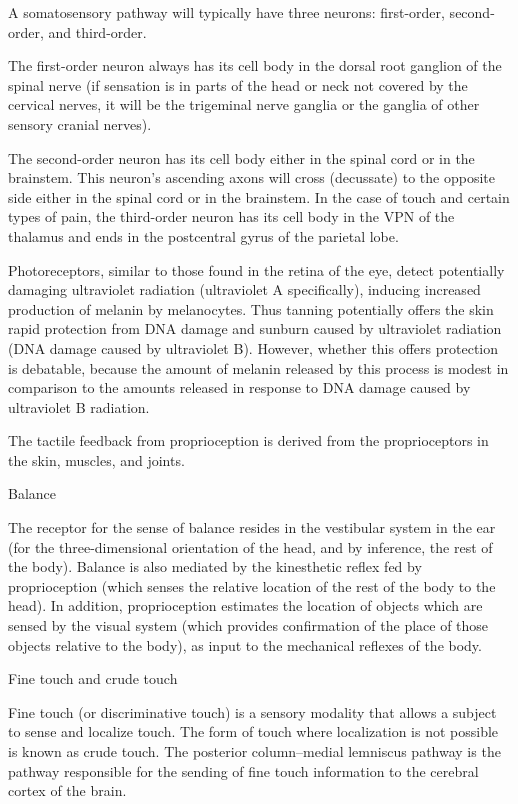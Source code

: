 A somatosensory pathway will typically have three neurons: first-order, second-order, and third-order.

The first-order neuron always has its cell body in the dorsal root ganglion of the spinal nerve (if sensation is in parts of the head or neck not covered by the cervical nerves, it will be the trigeminal nerve ganglia or the ganglia of other sensory cranial nerves).

The second-order neuron has its cell body either in the spinal cord or in the brainstem. This neuron's ascending axons will cross (decussate) to the opposite side either in the spinal cord or in the brainstem.
In the case of touch and certain types of pain, the third-order neuron has its cell body in the VPN of the thalamus and ends in the postcentral gyrus of the parietal lobe.

Photoreceptors, similar to those found in the retina of the eye, detect potentially damaging ultraviolet radiation (ultraviolet A specifically), inducing increased production of melanin by melanocytes. Thus tanning potentially offers the skin rapid protection from DNA damage and sunburn caused by ultraviolet radiation (DNA damage caused by ultraviolet B). However, whether this offers protection is debatable, because the amount of melanin released by this process is modest in comparison to the amounts released in response to DNA damage caused by ultraviolet B radiation.

The tactile feedback from proprioception is derived from the proprioceptors in the skin, muscles, and joints.

Balance

The receptor for the sense of balance resides in the vestibular system in the ear (for the three-dimensional orientation of the head, and by inference, the rest of the body). Balance is also mediated by the kinesthetic reflex fed by proprioception (which senses the relative location of the rest of the body to the head). In addition, proprioception estimates the location of objects which are sensed by the visual system (which provides confirmation of the place of those objects relative to the body), as input to the mechanical reflexes of the body.

Fine touch and crude touch

Fine touch (or discriminative touch) is a sensory modality that allows a subject to sense and localize touch. The form of touch where localization is not possible is known as crude touch. The posterior column--medial lemniscus pathway is the pathway responsible for the sending of fine touch information to the cerebral cortex of the brain.

